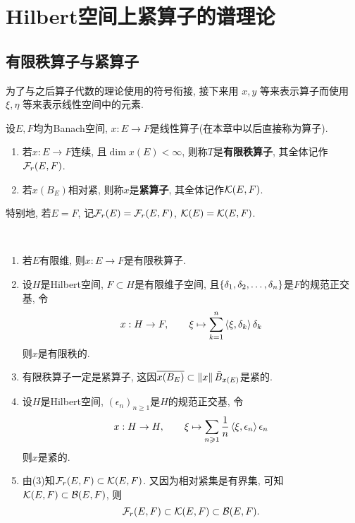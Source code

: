 
\chapter{Hilbert空间上紧算子的谱理论}

\section{有限秩算子与紧算子}

	为了与之后算子代数的理论使用的符号衔接, 接下来用 $ x, y $ 等来表示算子而使用 $ \xi,\eta $ 等来表示线性空间中的元素.

	\begin{Definition}
	设$ E, F $均为Banach空间, $ x : E\to F $是线性算子(在本章中以后直接称为算子).
	\begin{enumerate}[(1)]
	\item 若$ x : E\to F $连续, 且$ \dim x(E)<\infty $, 则称$ T $是\textbf{有限秩算子}, 其全体记作$ \mathcal{F}_{r}(E,F) $.
	\item 若$ x(B_E) $相对紧, 则称$ x $是\textbf{紧算子}, 其全体记作$ \mathcal{K}(E,F) $.
	\end{enumerate}
	特别地, 若$ E=F $, 记$ \mathcal{F}_{r}(E)=\mathcal{F}_{r}(E,F) $, $ \mathcal{K}(E)=\mathcal{K}(E,F) $.
	\end{Definition}
	
	\begin{Example}~
	\begin{enumerate}[(1)]
	\item 若$ E $有限维, 则$ x : E\to F $是有限秩算子.
	\item 设$ H $是Hilbert空间, $ F\subset H $是有限维子空间, 且$ \{ \delta_{1}, \delta_{2}, \dots, \delta_{n} \} $是$ F $的规范正交基, 令
	\[
	x : H\to F,\qquad \xi\mapsto\sum_{k=1}^n\left\langle \xi,\delta_k \right\rangle\delta_k
	\]
	则$ x $是有限秩的.
	\item 有限秩算子一定是紧算子, 这因$ \overline{x(B_E)}\subset\left\| x \right\|\bar{B}_{x(E)} $是紧的.
	\item 设$ H $是Hilbert空间, $ (\epsilon_n)_{n\geqslant 1} $是$ H $的规范正交基, 令
	\[
	x : H\to H,\qquad \xi\mapsto\sum_{n\geqslant 1}\frac{1}{n}\left\langle \xi,\epsilon_n \right\rangle\epsilon_n
	\]
	则$ x $是紧的.
	\item 由(3)知$ \mathcal{F}_{r}(E,F)\subset\mathcal{K}(E,F) $. 又因为相对紧集是有界集, 可知$ \mathcal{K}(E,F)\subset\mathcal{B}(E,F) $, 则
	\[
	\mathcal{F}_{r}(E,F)\subset\mathcal{K}(E,F)\subset\mathcal{B}(E,F).
	\]
	\end{enumerate}
	\end{Example}
	
